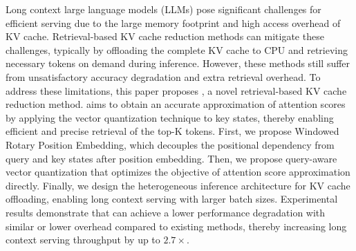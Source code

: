 Long context large language models (LLMs) pose significant challenges for efficient serving due to the large memory footprint and high access overhead of KV cache.
Retrieval-based KV cache reduction methods can mitigate these challenges, typically by offloading the complete KV cache to CPU and retrieving necessary tokens on demand during inference.
However, these methods still suffer from unsatisfactory accuracy degradation and extra retrieval overhead.
To address these limitations, this paper proposes {\name}, a novel retrieval-based KV cache reduction method.
{\name} aims to obtain an accurate approximation of attention scores by applying the vector quantization technique to key states, thereby enabling efficient and precise retrieval of the top-K tokens.
First, 
we propose Windowed Rotary Position Embedding, which decouples the positional dependency from query and key states after position embedding.
Then, 
we propose query-aware vector quantization that optimizes the objective of attention score approximation directly.
Finally, 
we design the heterogeneous inference architecture for KV cache offloading, enabling long context serving with larger batch sizes.
Experimental results demonstrate that {\name} can achieve a lower performance degradation with similar or lower overhead compared to existing methods, thereby increasing long context serving throughput by up to $2.7 \times$.
